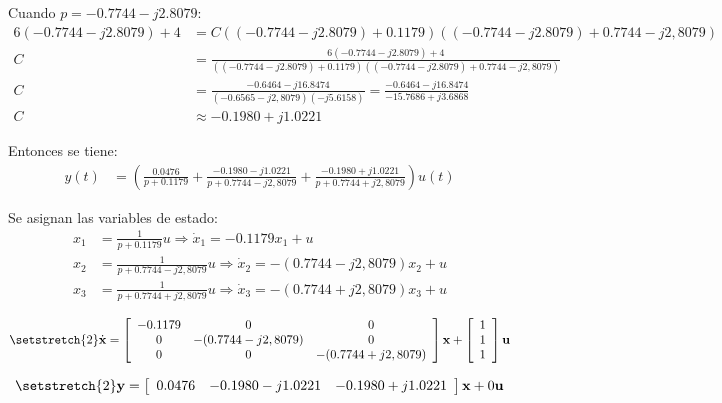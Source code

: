 Cuando $p=-0.7744-j2.8079$:
\begin{align*}
  6(-0.7744-j2.8079) + 4
  &= C ((-0.7744-j2.8079)+0.1179)((-0.7744-j2.8079)+0.7744-j2,8079)
  \\
  C &= \frac{6(-0.7744-j2.8079) + 4}
  {((-0.7744-j2.8079)+0.1179)((-0.7744-j2.8079)+0.7744-j2,8079)}
  \\
  C &= \frac{-0.6464-j16.8474}
  {(-0.6565-j2,8079)(-j5.6158)}
  = \frac{-0.6464-j16.8474}
  {-15.7686+j3.6868}
  \\
  C &\approx -0.1980+j1.0221
\end{align*}

Entonces se tiene:
\begin{align*}
  y(t) &= \left(
    \frac{0.0476}{p+0.1179}
    + \frac{-0.1980-j1.0221}{p+0.7744-j2,8079}
    + \frac{-0.1980+j1.0221}{p+0.7744+j2,8079}
  \right) u(t)
\end{align*}

Se asignan las variables de estado:
\begin{align*}
  x_1 &= \frac{1}{p+0.1179}u \Rightarrow \dot{x}_1 = -0.1179x_1 + u
  \\
  x_2 &= \frac{1}{p+0.7744-j2,8079}u \Rightarrow \dot{x}_2 = -(0.7744-j2,8079)x_2 + u
  \\
  x_3 &= \frac{1}{p+0.7744+j2,8079}u \Rightarrow \dot{x}_3 = -(0.7744+j2,8079)x_3 + u
\end{align*}

\[ \setstretch{2}
  \dot{\textbf{x}}=
  \left[
    {\begin{array}{ccc}
      -0.1179 & 0                 & 0 \\
      0       & -(0.7744-j2,8079) & 0 \\
      0       & 0                 & -(0.7744+j2,8079) \\
    \end{array}}
  \right]
  \textbf{x} +
  \left[
    {\begin{array}{cc}
      1 \\
      1 \\
      1 \\
    \end{array}}
  \right]
  \textbf{u}
\]

\[ \setstretch{2}
  \textbf{y}=
  \left[
    {\begin{array}{ccc}
      0.0476 & -0.1980-j1.0221     & -0.1980+j1.0221 \\
    \end{array}}
  \right]
  \textbf{x} +
  0
  \textbf{u}
\]
